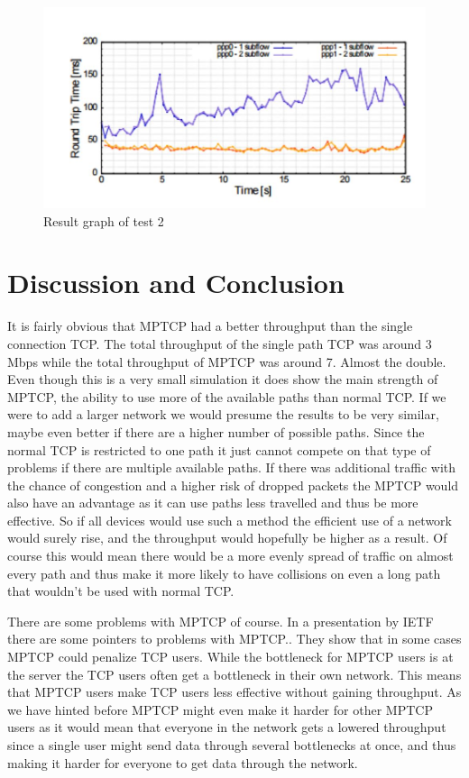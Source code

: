 \documentclass[11pt,twocolumn]{article}
\begin{document}
\begin{figure}[ht]
\begin{center}
\includegraphics[scale=0.5]{graph_3}
\caption{Result graph of test 2}
\end{center}
\end{figure}


\section{Discussion and Conclusion}

It is fairly obvious that MPTCP had a better throughput than the single connection TCP. The total throughput of the single path TCP was around 3 Mbps while the total throughput of MPTCP was around 7. Almost the double. Even though this is a very small simulation it does show the main strength of MPTCP, the ability to use more of the available paths than normal TCP. If we were to add a larger network we would presume the results to be very similar, maybe even better if there are a higher number of possible paths. Since the normal TCP is restricted to one path it just cannot compete on that type of problems if there are multiple available paths. If there was additional traffic with the chance of congestion and a higher risk of dropped packets the MPTCP would also have an advantage as it can use paths less travelled and thus be more effective. So if all devices would use such a method the efficient use of a network would surely rise, and the throughput would hopefully be higher as a result. Of course this would mean there would be a more evenly spread of traffic on almost every path and thus make it more likely to have collisions on even a long path that wouldn't be used with normal TCP.

There are some problems with MPTCP of course. In a presentation by IETF there are some pointers to problems with MPTCP.\cite{IETF-Probs}. They show that in some cases MPTCP could penalize TCP users. While the bottleneck for MPTCP users is at the server the TCP users often get a bottleneck in their own network. This means that MPTCP users make TCP users less effective without gaining throughput. As we have hinted before MPTCP might even make it harder for other MPTCP users as it would mean that everyone in the network gets a lowered throughput since a single user might send data through several bottlenecks at once, and thus making it harder for everyone to get data through the network.
\end{document}

